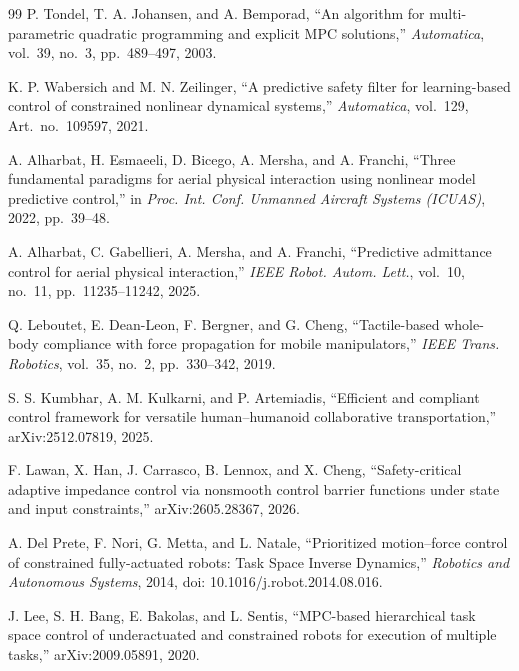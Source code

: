 \documentclass[journal]{IEEEtran}
\begin{document}
\begin{thebibliography}{99}
P. Tondel, T. A. Johansen, and A. Bemporad, ``An algorithm for
multi-parametric quadratic programming and explicit MPC solutions,''
\emph{Automatica}, vol.~39, no.~3, pp.~489--497, 2003.

K. P. Wabersich and M. N. Zeilinger, ``A predictive safety filter for
learning-based control of constrained nonlinear dynamical systems,''
\emph{Automatica}, vol.~129, Art.~no.~109597, 2021.

A. Alharbat, H. Esmaeeli, D. Bicego, A. Mersha, and A. Franchi,
``Three fundamental paradigms for aerial physical interaction using
nonlinear model predictive control,'' in \emph{Proc. Int. Conf. Unmanned
Aircraft Systems (ICUAS)}, 2022, pp.~39--48.

A. Alharbat, C. Gabellieri, A. Mersha, and A. Franchi, ``Predictive
admittance control for aerial physical interaction,'' \emph{IEEE Robot.
Autom. Lett.}, vol.~10, no.~11, pp.~11235--11242, 2025.

Q. Leboutet, E. Dean-Leon, F. Bergner, and G. Cheng, ``Tactile-based
whole-body compliance with force propagation for mobile manipulators,''
\emph{IEEE Trans. Robotics}, vol.~35, no.~2, pp.~330--342, 2019.

S. S. Kumbhar, A. M. Kulkarni, and P. Artemiadis, ``Efficient and
compliant control framework for versatile human--humanoid collaborative
transportation,'' arXiv:2512.07819, 2025.

F. Lawan, X. Han, J. Carrasco, B. Lennox, and X. Cheng,
``Safety-critical adaptive impedance control via nonsmooth control
barrier functions under state and input constraints,'' arXiv:2605.28367,
2026.

A. Del Prete, F. Nori, G. Metta, and L. Natale, ``Prioritized
motion--force control of constrained fully-actuated robots: Task Space
Inverse Dynamics,'' \emph{Robotics and Autonomous Systems}, 2014,
doi: 10.1016/j.robot.2014.08.016.

J. Lee, S. H. Bang, E. Bakolas, and L. Sentis, ``MPC-based hierarchical
task space control of underactuated and constrained robots for execution
of multiple tasks,'' arXiv:2009.05891, 2020.

\end{thebibliography}
\end{document}
